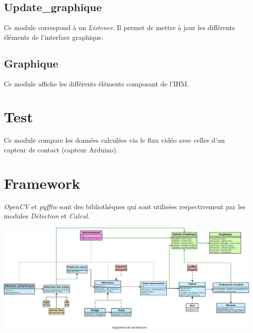 \documentclass[12pt,a4paper]{article}
\begin{document}
\subsection{Update\_graphique}
Ce module correspond à un \textit{Listener}. Il permet de mettre à jour les différents éléments de l'interface graphique.

\subsection{Graphique}
Ce module affiche les différents éléments composant de l'IHM.

\section{Test}
Ce module compare les données calculées via le flux vidéo avec celles d'un capteur de contact (capteur Arduino).

\section{Framework}
\textit{OpenCV} et \textit{pyfftw} sont des bibliothèques qui sont utilisées respectivement par les modules \textit{Détection} et \textit{Calcul}.

\newpage
\vspace*{-1.6in}
\vspace*{-\the\hoffset}
\thispagestyle{empty}
\includegraphics[scale=0.4,angle=90]{archi2.jpeg}
\vspace*{-1in}
\vspace*{-\the\hoffset}
\end{document}
